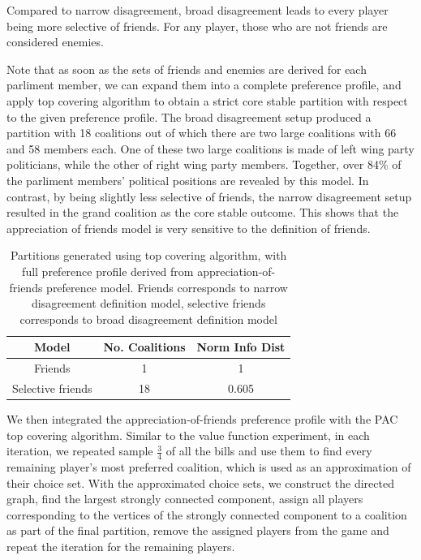 \documentclass[letterpaper]{article} %
\begin{document}
Compared to narrow disagreement, broad disagreement leads to every player being more selective of friends. For any player, those who are not friends are considered enemies.

Note that as soon as the sets of friends and enemies are derived for each parliment member, we can expand them into a complete preference profile, and apply top covering algorithm to obtain a strict core stable partition with respect to the given preference profile. The broad disagreement setup produced a partition with 18 coalitions out of which there are two large coalitions with 66 and 58 members each. One of these two large coalitions is made of left wing party politicians, while the other of right wing party members. Together, over 84\% of the parliment members' political positions are revealed by this model. In contrast, by being slightly less selective of friends, the narrow disagreement setup resulted in the grand coalition as the core stable outcome. This shows that the appreciation of friends model is very sensitive to the definition of friends.

\begin{table}[h!]
\centering
\begin{tabular}{c|c|c}
\hline
Model & No. Coalitions & Norm Info Dist \\
\hline
Friends & 1 & 1 \\
Selective friends & 18 & 0.605 \\
\hline
\end{tabular}
\caption{Partitions generated using top covering algorithm, with full preference profile derived from appreciation-of-friends preference model. Friends corresponds to narrow disagreement definition model, selective friends corresponds to broad disagreement definition model}
\label{table:friends_models}
\end{table}

We then integrated the appreciation-of-friends preference profile with the PAC top covering algorithm. Similar to the value function experiment, in each iteration, we repeated sample $\frac{3}{4}$ of all the bills and use them to find every remaining player's most preferred coalition, which is used as an approximation of their choice set. With the approximated choice sets, we construct the directed graph, find the largest strongly connected component, assign all players corresponding to the vertices of the strongly connected component to a coalition as part of the final partition, remove the assigned players from the game and repeat the iteration for the remaining players.
\end{document}
